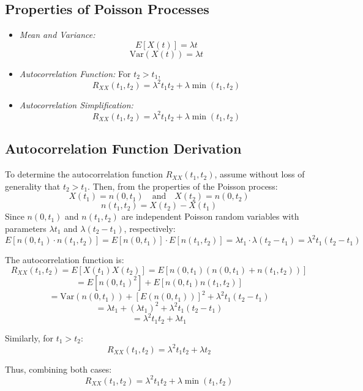 \documentclass[12pt]{article}
\begin{document}
\subsection{Properties of Poisson Processes}
\begin{itemize}
    \item \textit{Mean and Variance:}
    \[
    E[X(t)] = \lambda t
    \]
    \[
    \text{Var}(X(t)) = \lambda t
    \]
    
    \item \textit{Autocorrelation Function:} For \( t_2 > t_1 \),
    \[
    R_{XX}(t_1, t_2) = \lambda^2 t_1 t_2 + \lambda \min(t_1, t_2)
    \]
    
    \item \textit{Autocorrelation Simplification:}
    \[
    R_{XX}(t_1, t_2) = \lambda^2 t_1 t_2 + \lambda \min(t_1, t_2)
    \]
\end{itemize}

\subsection{Autocorrelation Function Derivation}
To determine the autocorrelation function \( R_{XX}(t_1, t_2) \), assume without loss of generality that \( t_2 > t_1 \). Then, from the properties of the Poisson process:
\[
X(t_1) = n(0, t_1) \quad \text{and} \quad X(t_2) = n(0, t_2)
\]
\[
n(t_1, t_2) = X(t_2) - X(t_1)
\]
Since \( n(0, t_1) \) and \( n(t_1, t_2) \) are independent Poisson random variables with parameters \( \lambda t_1 \) and \( \lambda (t_2 - t_1) \), respectively:
\[
E[n(0, t_1) \cdot n(t_1, t_2)] = E[n(0, t_1)] \cdot E[n(t_1, t_2)] = \lambda t_1 \cdot \lambda (t_2 - t_1) = \lambda^2 t_1 (t_2 - t_1)
\]

The autocorrelation function is:
\[
R_{XX}(t_1, t_2) = E[X(t_1) X(t_2)] = E\left[ n(0, t_1) (n(0, t_1) + n(t_1, t_2)) \right]
\]
\[
= E[n(0, t_1)^2] + E[n(0, t_1) n(t_1, t_2)]
\]
\[
= \text{Var}(n(0, t_1)) + [E(n(0, t_1))]^2 + \lambda^2 t_1 (t_2 - t_1)
\]
\[
= \lambda t_1 + (\lambda t_1)^2 + \lambda^2 t_1 (t_2 - t_1)
\]
\[
= \lambda^2 t_1 t_2 + \lambda t_1
\]

Similarly, for \( t_1 > t_2 \):
\[
R_{XX}(t_1, t_2) = \lambda^2 t_1 t_2 + \lambda t_2
\]

Thus, combining both cases:
\[
R_{XX}(t_1, t_2) = \lambda^2 t_1 t_2 + \lambda \min(t_1, t_2)
\]
\end{document}
